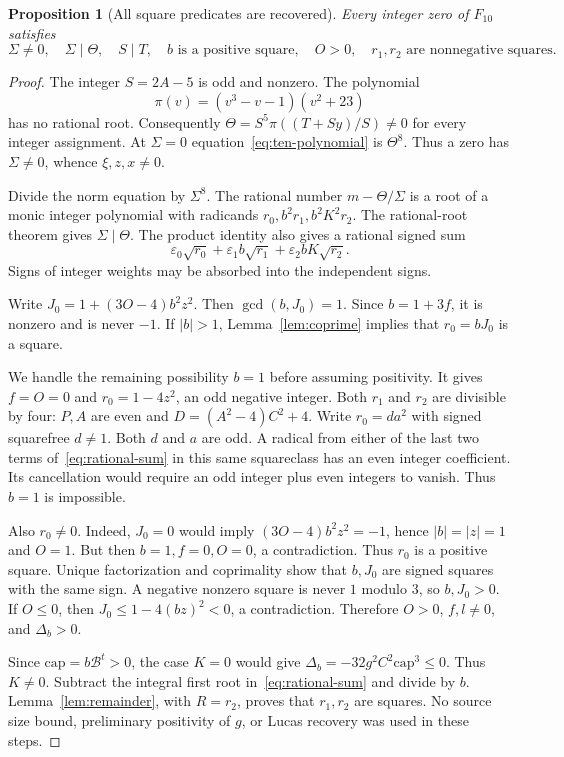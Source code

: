\documentclass[11pt,letterpaper]{article}
\newtheorem{proposition}[theorem]{Proposition}
\theoremstyle{remark}\newtheorem{remark}[theorem]{Remark}
\begin{document}
\begin{proposition}[All square predicates are recovered]\label{prop:separation}
Every integer zero of $F_{10}$ satisfies
\[
 \Sigma\ne0,\quad \Sigma\mid\Theta,\quad S\mid T,\quad
 b\text{ is a positive square},\quad O>0,\quad
 r_1,r_2\text{ are nonnegative squares}.
\]
\end{proposition}
\begin{proof}
The integer $S=2A-5$ is odd and nonzero. The polynomial
\[
 \pi(v)=(v^3-v-1)(v^2+23)
\]
has no rational root. Consequently
$\Theta=S^5\pi((T+Sy)/S)\ne0$ for every integer assignment.
At $\Sigma=0$ equation~\eqref{eq:ten-polynomial} is $\Theta^8$.
Thus a zero has $\Sigma\ne0$, whence $\xi,z,x\ne0$.

Divide the norm equation by $\Sigma^8$.
The rational number $m-\Theta/\Sigma$ is a root of a monic integer
polynomial with radicands $r_0,b^2r_1,b^2K^2r_2$. The rational-root
theorem gives $\Sigma\mid\Theta$. The product identity also gives a
rational signed sum
\begin{equation}\label{eq:rational-sum}
 \varepsilon_0\sqrt{r_0}
 +\varepsilon_1b\sqrt{r_1}
 +\varepsilon_2bK\sqrt{r_2}.
\end{equation}
Signs of integer weights may be absorbed into the independent signs.

Write $J_0=1+(3O-4)b^2z^2$. Then $\gcd(b,J_0)=1$.
Since $b=1+3f$, it is nonzero and is never $-1$. If $|b|>1$,
Lemma~\ref{lem:coprime} implies that $r_0=bJ_0$ is a square.

We handle the remaining possibility $b=1$ before assuming positivity.
It gives $f=O=0$ and $r_0=1-4z^2$, an odd negative integer.
Both $r_1$ and $r_2$ are divisible by four: $P,A$ are even and
$D=(A^2-4)C^2+4$. Write $r_0=da^2$ with signed squarefree $d\ne1$.
Both $d$ and $a$ are odd. A radical from either of the last two terms
of~\eqref{eq:rational-sum} in this same squareclass has an even integer
coefficient. Its cancellation would require an odd integer plus even
integers to vanish. Thus $b=1$ is impossible.

Also $r_0\ne0$. Indeed, $J_0=0$ would imply
$(3O-4)b^2z^2=-1$, hence $|b|=|z|=1$ and $O=1$.
But then $b=1,f=0,O=0$, a contradiction.
Thus $r_0$ is a positive square. Unique factorization and coprimality
show that $b,J_0$ are signed squares with the same sign.
A negative nonzero square is never $1$ modulo $3$, so $b,J_0>0$.
If $O\le0$, then $J_0\le1-4(bz)^2<0$, a contradiction.
Therefore $O>0$, $f,l\ne0$, and $\Delta_b>0$.

Since $\mathrm{cap}=b\mathcal B^t>0$, the case $K=0$ would give
$\Delta_b=-32g^2C^2\mathrm{cap}^3\le0$. Thus $K\ne0$.
Subtract the integral first root in~\eqref{eq:rational-sum} and divide
by $b$. Lemma~\ref{lem:remainder}, with $R=r_2$, proves that $r_1,r_2$
are squares. No source size bound, preliminary positivity of $g$,
or Lucas recovery was used in these steps.


\end{proof}
\end{document}
